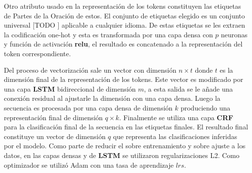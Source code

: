 Otro atributo usado en la representación de los tokens constituyen las etiquetas de Partes de la Oración de estos.
El conjunto de etiquetas elegido es un conjunto universal [TODO \cite{Referencia a la def}] aplicable a cualquier idioma.
De estas etiquetas se les extraen la codificación one-hot y esta es transformada por una capa densa con $p$ neuronas
y función de activación \textbf{relu}, el resultado es concatenado a la representación del token correspondiente.

Del proceso de vectorización sale un vector con dimensión $n \times t$ donde $t$ es la dimensión final de la representación
de los tokens. Este vector es modificado por una capa \textbf{LSTM} bidireccional de dimensión $m$, a esta salida se le 
añade una conexión residual al ajustarle la dimensión con una capa densa. Luego la secuencia es procesada por una 
capa densa de dimensión $k$ produciendo una representación final de dimensión $q \times k$.
Finalmente se utiliza una capa \textbf{CRF}
para la clasificación final de la secuencia en las etiquetas finales. El resultado final constituye un vector
de dimensión $q$ que representa las clasificaciones inferidas por el modelo.
Como parte de reducir el sobre entrenamiento y sobre ajuste a los datos, en
las capas densas y de \textbf{LSTM} se utilizaron regularizaciones L2. Como optimizador se utilizó Adam con una 
tasa de aprendizaje $lrs$.

